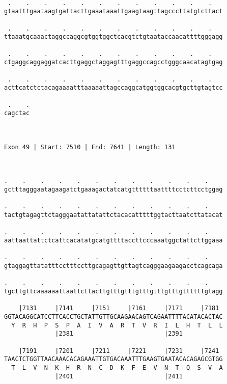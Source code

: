 \documentclass{article}
\begin{document}
\begin{Verbatim}
  
 .    .    .    .    .    .    .    .    .    .    .    .   
gtaatttgaataagtgattacttgaaataaattgaagtaagttagcccttatgtcttact
                                                            
 .    .    .    .    .    .    .    .    .    .    .    .   
ttaaatgcaaactaggccaggcgtggtggctcacgtctgtaataccaacattttgggagg
                                                            
 .    .    .    .    .    .    .    .    .    .    .    .   
ctgaggcaggaggatcacttgaggctaggagtttgaggccagcctgggcaacatagtgag
                                                            
 .    .    .    .    .    .    .    .    .    .    .    .   
acttcatctctacagaaaatttaaaaattagccaggcatggtggcacgtgcttgtagtcc
                                                            
 .    .
cagctac
       
       
 
Exon 49 | Start: 7510 | End: 7641 | Length: 131



.    .    .    .    .    .    .    .    .    .    .    .    
gctttagggaatagaagatctgaaagactatcatgttttttaattttcctcttcctggag
                                                            
.    .    .    .    .    .    .    .    .    .    .    .    
tactgtagagttctagggaatattatattctacacatttttggtacttaatcttatacat
                                                            
.    .    .    .    .    .    .    .    .    .    .    .    
aattaattattctcattcacatatgcatgttttaccttcccaaatggctattcttggaaa
                                                            
.    .    .    .    .    .    .    .    .    .    .    .    
gtaggagttatatttcctttccttgcagagttgttagtcagggaagaagacctcagcaga
                                                            
.    .    .    .    .    .    .    .    .    .    .    .    
tgcttgttcaaaaaattaattcttacttgtttgtttgtttgtttgtttgttttttgtagg
                                                            
    |7131     |7141     |7151     |7161     |7171     |7181 
GGTACAGGCATCCTTCACCTGCTATTGTTGCAAGAACAGTCAGAATTTTACATACACTAC
  Y  R  H  P  S  P  A  I  V  A  R  T  V  R  I  L  H  T  L  L
              |2381                         |2391           
  
    |7191     |7201     |7211     |7221     |7231     |7241 
TAACTCTGGTTAACAAACACAGAAATTGTGACAAATTTGAAGTGAATACACAGAGCGTGG
  T  L  V  N  K  H  R  N  C  D  K  F  E  V  N  T  Q  S  V  A
              |2401                         |2411           
  

\end{Verbatim}
\end{document}
